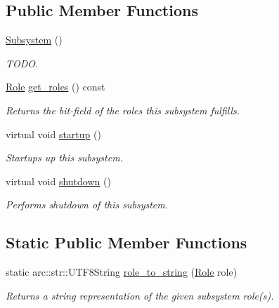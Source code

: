 \subsection*{Public Member Functions}
\begin{DoxyCompactItemize}
\item 
\hyperlink{classomi_1_1ss_1_1_subsystem_aa0cef879ba17e5a5f8732dad953c431a}{Subsystem} ()\hypertarget{classomi_1_1ss_1_1_subsystem_aa0cef879ba17e5a5f8732dad953c431a}{}\label{classomi_1_1ss_1_1_subsystem_aa0cef879ba17e5a5f8732dad953c431a}

\begin{DoxyCompactList}\small\item\em T\+O\+DO. \end{DoxyCompactList}\item 
\hyperlink{classomi_1_1ss_1_1_subsystem_a4dd37e93b7d0b1b3926107258d5564f1}{Role} \hyperlink{classomi_1_1ss_1_1_subsystem_ab12658bc2095168cb0c17c3201eff894}{get\+\_\+roles} () const \hypertarget{classomi_1_1ss_1_1_subsystem_ab12658bc2095168cb0c17c3201eff894}{}\label{classomi_1_1ss_1_1_subsystem_ab12658bc2095168cb0c17c3201eff894}

\begin{DoxyCompactList}\small\item\em Returns the bit-\/field of the roles this subsystem fulfills. \end{DoxyCompactList}\item 
virtual void \hyperlink{classomi_1_1ss_1_1_subsystem_a4b0ea0b6a120c551d73151f0e0432197}{startup} ()
\begin{DoxyCompactList}\small\item\em Startups up this subsystem. \end{DoxyCompactList}\item 
virtual void \hyperlink{classomi_1_1ss_1_1_subsystem_ab5855f3a5a4ec4375d2f2fea1a9bfbc5}{shutdown} ()
\begin{DoxyCompactList}\small\item\em Performs shutdown of this subsystem. \end{DoxyCompactList}\end{DoxyCompactItemize}
\subsection*{Static Public Member Functions}
\begin{DoxyCompactItemize}
\item 
static arc\+::str\+::\+U\+T\+F8\+String \hyperlink{classomi_1_1ss_1_1_subsystem_ad928b1c2494181a422fd0e7e530a921b}{role\+\_\+to\+\_\+string} (\hyperlink{classomi_1_1ss_1_1_subsystem_a4dd37e93b7d0b1b3926107258d5564f1}{Role} role)\hypertarget{classomi_1_1ss_1_1_subsystem_ad928b1c2494181a422fd0e7e530a921b}{}\label{classomi_1_1ss_1_1_subsystem_ad928b1c2494181a422fd0e7e530a921b}

\begin{DoxyCompactList}\small\item\em Returns a string representation of the given subsystem role(s). \end{DoxyCompactList}\end{DoxyCompactItemize}
